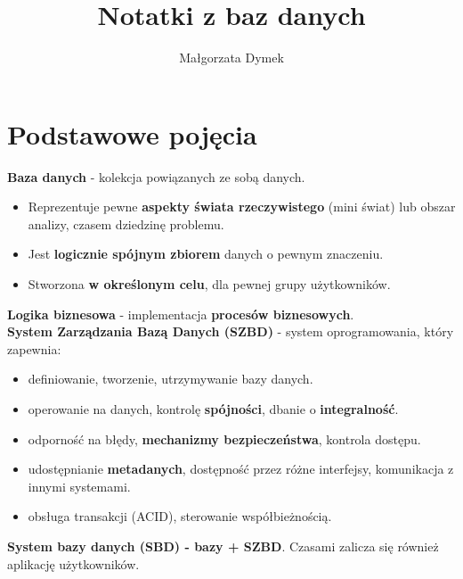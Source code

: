 \documentclass[a4paper]{article}
\title{Notatki z baz danych}
\author{Małgorzata Dymek}
\date{}
\begin{document}
\maketitle
\section{Podstawowe pojęcia}

\textbf{Baza danych} -  kolekcja powiązanych ze sobą danych.
\begin{itemize}
    \item Reprezentuje pewne \textbf{aspekty świata rzeczywistego} (mini świat) lub obszar analizy, czasem dziedzinę problemu.
    \item Jest \textbf{logicznie spójnym zbiorem} danych o pewnym znaczeniu.
    \item Stworzona \textbf{w określonym celu}, dla pewnej grupy użytkowników.
\end{itemize}

\textbf{Logika biznesowa} -  implementacja \textbf{procesów biznesowych}.\\

\textbf{System Zarządzania Bazą Danych (SZBD)} - system oprogramowania, który zapewnia: 
\begin{itemize}
    \item definiowanie, tworzenie, utrzymywanie bazy danych.
    \item operowanie na danych, kontrolę \textbf{spójności}, dbanie o \textbf{integralność}.
    \item odporność na błędy, \textbf{mechanizmy bezpieczeństwa}, kontrola dostępu.
    \item udostępnianie \textbf{metadanych}, dostępność przez różne interfejsy, komunikacja z innymi systemami.
    \item obsługa transakcji (ACID), sterowanie współbieżnością.
\end{itemize} 

\textbf{System bazy danych (SBD) - bazy + SZBD}. Czasami zalicza się również aplikację użytkowników.\\
\end{document}
